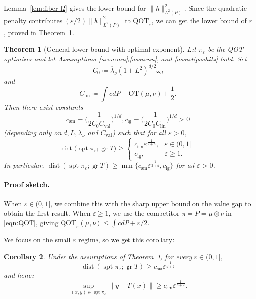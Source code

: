 \documentclass{article}
\theoremstyle{plain}
\newtheorem{theorem}{Theorem}[section]
\newtheorem{corollary}[theorem]{Corollary}
\theoremstyle{definition}
\theoremstyle{remark}
\numberwithin{equation}{section}
\DeclareMathOperator{\spt}{spt}
\DeclareMathOperator{\gr}{gr}
\DeclareMathOperator{\dist}{dist}
\newcommand{\OT}{\mathrm{OT}}
\newcommand{\QOT}{\mathrm{QOT}}
\begin{document}
Lemma~\ref{lem:fiber-l2} gives the lower bound for $\|h\|_{L^2(P)}^2$.
Since the quadratic penalty contributes $(\varepsilon/2)\|h\|_{L^2(P)}^2$ to $\QOT_\varepsilon$, we can get the lower bound of $r$, proved in Theorem~\ref{thm:general-lb}.
\begin{theorem}[General lower bound with optimal exponent]\label{thm:general-lb}
Let $\pi_\varepsilon$ be the QOT optimizer and let Assumptions~\ref{assu:mu},\ref{assu:nu}, and \ref{assu:lipschitz} hold. 
Set
$$
C_0\coloneqq\overline\lambda_\nu(1+L^2)^{d/2}\omega_d 
$$
and
$$
C_{\mathrm{lin}}\coloneqq\int cdP-\OT(\mu,\nu)+\frac12.
$$
Then there exist constants
$$
c_{\mathrm{sm}}=\Big(\frac1{2C_0C_\mathrm{val}}\Big)^{1/d},c_{\mathrm{lg}}=\Big(\frac1{2C_0C_\mathrm{lin}}\Big)^{1/d}>0
$$
(depending only on $d,L,\overline\lambda_\nu$ and $C_{\mathrm{val}}$) such that for all $\varepsilon>0$,
\begin{equation}\label{eqn:gen-lb-all-eps}
\dist\bigl(\spt\pi_\varepsilon;\gr T\bigr)\ge
\begin{cases}
c_{\mathrm{sm}}\varepsilon^{\frac{1}{2+d}},&\varepsilon\in(0,1],\\
c_{\mathrm{lg}},&\varepsilon\ge1.
\end{cases}
\end{equation}
In particular, $\dist(\spt\pi_\varepsilon;\gr T)\ge\min\{c_{\mathrm{sm}}\varepsilon^{\frac{1}{2+d}},c_{\mathrm{lg}}\}$ for all $\varepsilon>0$.
\end{theorem}
\paragraph{Proof sketch.}
When $\varepsilon\in(0,1]$, we combine this with the sharp upper bound on the value gap to obtain the first result.
When $\varepsilon\ge1$, we use the competitor $\pi=P=\mu\otimes\nu$ in \eqref{eqn:QOT}, giving $\QOT_\varepsilon(\mu,\nu)\le\int cdP+\varepsilon/2$.

We focus on the small $\varepsilon$ regime, so we get this corollary:
\begin{corollary}\label{cor:gen-lb-small}
Under the assumptions of Theorem~\ref{thm:general-lb}, for every $\varepsilon\in(0,1]$,
$$
\dist(\spt\pi_\varepsilon;\gr T)\ge c_{\mathrm{sm}}\varepsilon^{\frac{1}{d+2}}
$$
and hence 
$$
\sup_{(x,y)\in\spt\pi_\varepsilon}\|y-T(x)\|\ge c_{\mathrm{sm}}\varepsilon^{\frac{1}{d+2}}.
$$
\end{corollary}
\end{document}
